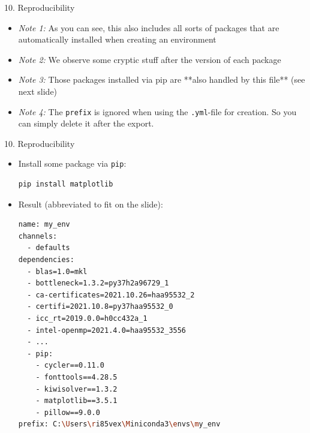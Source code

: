 \documentclass[11pt,compress,t,notes=noshow, xcolor=table]{beamer}
\begin{document}

\begin{vbframe}{10. Reproducibility}

\vfill

\begin{itemize}
	\item \textit{Note 1:} As you can see, this also includes all sorts of packages that are automatically
  installed when creating an environment
	\item \textit{Note 2:} We observe some cryptic stuff after the version of each package 
  \item \textit{Note 3:} Those packages installed via pip are **also handled by this file** (see next slide)
  \item \textit{Note 4:} The \texttt{prefix} is ignored when using the \texttt{.yml}-file for creation.
  So you can simply delete it after the export.
\end{itemize}

\vfill

\end{vbframe}


\begin{vbframe}{10. Reproducibility}

\vfill

\begin{itemize}
	\item Install some package via \texttt{pip}:
		\begin{lstlisting}[language=bash]
pip install matplotlib
		\end{lstlisting}
	\item Result (abbreviated to fit on the slide):
		\begin{lstlisting}[language=bash,basicstyle=\tiny\ttfamily]
name: my_env
channels:
  - defaults
dependencies:
  - blas=1.0=mkl
  - bottleneck=1.3.2=py37h2a96729_1
  - ca-certificates=2021.10.26=haa95532_2
  - certifi=2021.10.8=py37haa95532_0
  - icc_rt=2019.0.0=h0cc432a_1
  - intel-openmp=2021.4.0=haa95532_3556
  - ...
  - pip:
    - cycler==0.11.0
    - fonttools==4.28.5
    - kiwisolver==1.3.2
    - matplotlib==3.5.1
    - pillow==9.0.0
prefix: C:\Users\ri85vex\Miniconda3\envs\my_env
		\end{lstlisting}
\end{itemize}

\vfill

\end{vbframe}
\end{document}
